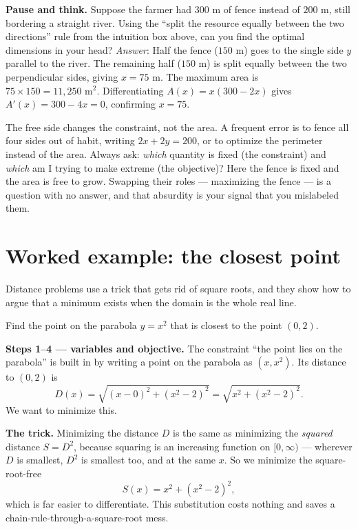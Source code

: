 \begin{recoverybox}
\textbf{Pause and think.} Suppose the farmer had $300\text{ m}$ of fence instead of
$200\text{ m}$, still bordering a straight river. Using the ``split the resource equally
between the two directions'' rule from the intuition box above, can you find the
optimal dimensions in your head?
\emph{Answer}: Half the fence ($150\text{ m}$) goes to the single side $y$ parallel to
the river. The remaining half ($150\text{ m}$) is split equally between the two
perpendicular sides, giving $x = 75\text{ m}$. The maximum area is $75 \times 150 =
11{,}250\text{ m}^2$. Differentiating $A(x) = x(300-2x)$ gives $A'(x) = 300 - 4x = 0$,
confirming $x = 75$.
\end{recoverybox}

\begin{trapbox}
The free side changes the constraint, not the area. A frequent error is to fence all
four sides out of habit, writing $2x+2y=200$, or to optimize the perimeter instead of
the area. Always ask: \emph{which} quantity is fixed (the constraint) and \emph{which}
am I trying to make extreme (the objective)? Here the fence is fixed and the area is
free to grow. Swapping their roles --- maximizing the fence --- is a question with no
answer, and that absurdity is your signal that you mislabeled them.
\end{trapbox}

\section{Worked example: the closest point}

Distance problems use a trick that gets rid of square roots, and they show how
to argue that a minimum exists when the domain is the whole real line.

\begin{example}\label{ch17:ex-distance}
Find the point on the parabola $y = x^2$ that is closest to the point $(0, 2)$.
\end{example}

\textbf{Steps 1--4 --- variables and objective.} The constraint ``the point lies on the
parabola'' is built in by writing a point on the parabola as
$(x, x^2)$. Its distance to $(0,2)$ is
\[
D(x) = \sqrt{(x-0)^2 + (x^2 - 2)^2} = \sqrt{x^2 + (x^2-2)^2}.
\]
We want to minimize this.

\textbf{The trick.} Minimizing the distance $D$ is the same as minimizing the
\emph{squared} distance $S = D^2$, because squaring is an increasing function on
$[0,\infty)$ --- wherever $D$ is smallest, $D^2$ is smallest too, and at the same
$x$. So we minimize the square-root-free
\[
S(x) = x^2 + (x^2 - 2)^2,
\]
which is far easier to differentiate. This substitution costs nothing and saves a
chain-rule-through-a-square-root mess.

